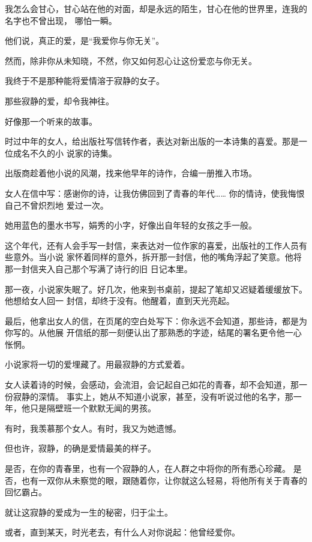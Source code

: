 		我怎么会甘心，甘心站在他的对面，却是永远的陌生，甘心在他的世界里，连我的名字也不曾出现，
	哪怕一瞬。

		他们说，真正的爱，是“我爱你与你无关”。\par
		然而，除非你从未知晓，不然，你又如何忍心让这份爱恋与你无关。\par
		我终于不是那种能将爱情溶于寂静的女子。

		\vspace{1em}
		那些寂静的爱，却令我神往。\par
		好像那一个听来的故事。

		时过中年的女人，给出版社写信转作者，表达对新出版的一本诗集的喜爱。那是一位成名不久的小
	说家的诗集。

		出版商趁着他小说的风潮，找来他早年的诗作，合编一册推入市场。

		女人在信中写：感谢你的诗，让我仿佛回到了青春的年代…… 你的情诗，使我悔恨自己不曾炽烈地
	爱过一次。

		她用蓝色的墨水书写，娟秀的小字，好像出自年轻的女孩之手一般。

		这个年代，还有人会手写一封信，来表达对一位作家的喜爱，出版社的工作人员有些意外。当小说
	家怀着同样的意外，拆开那一封信，他的嘴角浮起了笑意。他将那一封信夹入自己那个写满了诗行的旧
	日记本里。

		那一夜，小说家失眠了。好几次，他来到书桌前，提起了笔却又迟疑着缓缓放下。他想给女人回一
	封信，却终于没有。他醒着，直到天光亮起。

		最后，他拿出女人的信，在页尾的空白处写下：你永远不会知道，那些诗，都是为你写的。从他展
	开信纸的那一刻便认出了那熟悉的字迹，结尾的署名更令他一心怅惘。

		小说家将一切的爱埋藏了。用最寂静的方式爱着。

		女人读着诗的时候，会感动，会流泪，会记起自己如花的青春，却不会知道，那一份寂静的深情。
	事实上，她从不知道小说家，甚至，没有听说过他的名字，那一年，他只是隔壁班一个默默无闻的男孩。

		\vspace{1em}
		有时，我羡慕那个女人。有时，我又为她遗憾。

		但也许，寂静，的确是爱情最美的样子。

		是否，在你的青春里，也有一个寂静的人，在人群之中将你的所有悉心珍藏。
		是否，也有一双你从未察觉的眼，跟随着你，让你就这么轻易，将他所有关于青春的回忆霸占。

		就让这寂静的爱成为一生的秘密，归于尘土。

		或者，直到某天，时光老去，有什么人对你说起：他曾经爱你。


